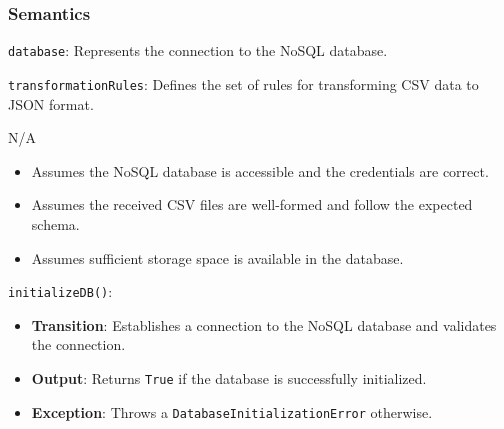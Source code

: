 \documentclass[12pt, titlepage]{article}
\begin{document}
\subsubsection{Semantics}
\begin{description}
  \item[State Variables:]
  \item
  \texttt{database}: Represents the connection to the NoSQL database.
  \item
  \texttt{transformationRules}: Defines the set of rules for transforming CSV data to
  JSON format.
  
  \item[Environment Variables:] N/A

  \item[Assumptions:]
  \item
  \begin{itemize}
    \item Assumes the NoSQL database is accessible and the credentials are correct.
  \end{itemize}
  \item
  \begin{itemize}
    \item Assumes the received CSV files are well-formed and follow the expected schema.
  \end{itemize}
  \item 
  \begin{itemize}
    \item Assumes sufficient storage space is available in the database.
  \end{itemize}
  \item 

  \item[Access Routine Semantics:] 
  \item
  \texttt{initializeDB()}:
  \item
  \begin{itemize}
    \item \textbf{Transition}: Establishes a connection to the NoSQL database and validates
    the connection.
  \end{itemize}
  \item
  \begin{itemize}
    \item \textbf{Output}: Returns \texttt{True} if the database is successfully initialized.
  \end{itemize}
  \item
  \begin{itemize}
    \item \textbf{Exception}: Throws a \texttt{DatabaseInitializationError} otherwise.
  \end{itemize}
  \item 


\end{description}
\end{document}
